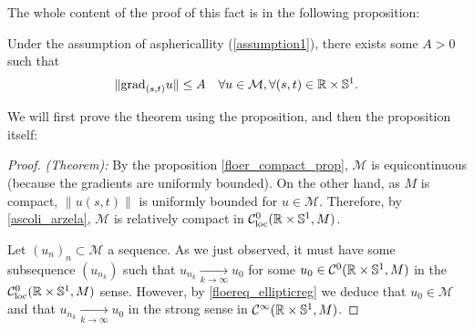 The whole content of the proof of this fact is in the following proposition:

\begin{prop} \label{floer_compact_prop}
Under the assumption of asphericallity (\ref{assumption1}), there exists some $A > 0$ such that
\[\|\text{grad}_{(s,t)}u\| \leq A \ \ \ \forall u \in \mathcal{M}, \forall (s,t) \in \R \times \con{S}^1 .\]
\end{prop}

We will first prove the theorem using the proposition, and then the proposition itself:

\begin{proof} {\it (Theorem):} By the proposition \ref{floer_compact_prop}, $\mathcal{M}$ is equicontinuous (because the gradients are uniformly bounded). On the other hand, as $M$ is compact, $\|u(s,t)\|$ is uniformly bounded for $u \in \mathcal{M}$. Therefore, by \ref{ascoli_arzela}, $\mathcal{M}$ is relatively compact in $\mathcal{C}_{\text{loc}}^0(\mathbb{R} \times \mathbb{S}^1,M)$.

Let $(u_n)_n \subset \mathcal{M}$ a sequence. As we just observed, it must have some subsequence $(u_{n_k})$ such that $u_{n_k} \xrightarrow[k \rightarrow \infty]{} u_0$ for some $u_0 \in \mathcal{C}^0(\mathbb{R}\times\mathbb{S}^1,M)$ in the $\mathcal{C}_{\text{loc}}^0(\mathbb{R}\times\mathbb{S}^1,M)$ sense. However, by \ref{floereq_ellipticreg} we deduce that $u_0 \in \mathcal{M}$ and that $u_{n_k} \xrightarrow[k\rightarrow \infty]{} u_0$ in the strong sense in $\mathcal{C}^{\infty}(\mathbb{R} \times \mathbb{S}^1,M)$.
\end{proof}
